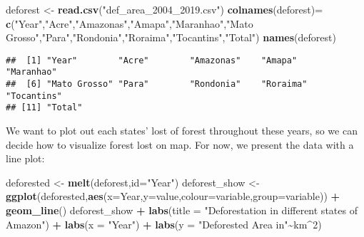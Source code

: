 \documentclass[
]{article}
\newenvironment{Shaded}{\begin{snugshade}}{\end{snugshade}}
\newcommand{\AttributeTok}[1]{\textcolor[rgb]{0.13,0.29,0.53}{#1}}
\newcommand{\DecValTok}[1]{\textcolor[rgb]{0.00,0.00,0.81}{#1}}
\newcommand{\FunctionTok}[1]{\textcolor[rgb]{0.13,0.29,0.53}{\textbf{#1}}}
\newcommand{\NormalTok}[1]{#1}
\newcommand{\OtherTok}[1]{\textcolor[rgb]{0.56,0.35,0.01}{#1}}
\newcommand{\SpecialCharTok}[1]{\textcolor[rgb]{0.81,0.36,0.00}{\textbf{#1}}}
\newcommand{\StringTok}[1]{\textcolor[rgb]{0.31,0.60,0.02}{#1}}
\begin{document}
\begin{Shaded}
\begin{Highlighting}[]
\NormalTok{deforest }\OtherTok{\textless{}{-}} \FunctionTok{read.csv}\NormalTok{(}\StringTok{"def\_area\_2004\_2019.csv"}\NormalTok{)}
\FunctionTok{colnames}\NormalTok{(deforest)}\OtherTok{=} \FunctionTok{c}\NormalTok{(}\StringTok{"Year"}\NormalTok{,}\StringTok{"Acre"}\NormalTok{,}\StringTok{"Amazonas"}\NormalTok{,}\StringTok{"Amapa"}\NormalTok{,}\StringTok{"Maranhao"}\NormalTok{,}\StringTok{"Mato Grosso"}\NormalTok{,}\StringTok{"Para"}\NormalTok{,}\StringTok{"Rondonia"}\NormalTok{,}\StringTok{"Roraima"}\NormalTok{,}\StringTok{"Tocantins"}\NormalTok{,}\StringTok{"Total"}\NormalTok{)}
\FunctionTok{names}\NormalTok{(deforest)}
\end{Highlighting}
\end{Shaded}

\begin{verbatim}
##  [1] "Year"        "Acre"        "Amazonas"    "Amapa"       "Maranhao"   
##  [6] "Mato Grosso" "Para"        "Rondonia"    "Roraima"     "Tocantins"  
## [11] "Total"
\end{verbatim}

We want to plot out each states' lost of forest throughout these years,
so we can decide how to visualize forest lost on map. For now, we
present the data with a line plot:

\begin{Shaded}
\begin{Highlighting}[]
\NormalTok{deforested }\OtherTok{\textless{}{-}} \FunctionTok{melt}\NormalTok{(deforest,}\AttributeTok{id=}\StringTok{"Year"}\NormalTok{)}
\NormalTok{deforest\_show }\OtherTok{\textless{}{-}} \FunctionTok{ggplot}\NormalTok{(deforested,}\FunctionTok{aes}\NormalTok{(}\AttributeTok{x=}\NormalTok{Year,}\AttributeTok{y=}\NormalTok{value,}\AttributeTok{colour=}\NormalTok{variable,}\AttributeTok{group=}\NormalTok{variable)) }\SpecialCharTok{+} \FunctionTok{geom\_line}\NormalTok{()}
\NormalTok{deforest\_show }\SpecialCharTok{+} \FunctionTok{labs}\NormalTok{(}\AttributeTok{title =} \StringTok{"Deforestation in different states of Amazon"}\NormalTok{) }\SpecialCharTok{+} \FunctionTok{labs}\NormalTok{(}\AttributeTok{x =} \StringTok{"Year"}\NormalTok{) }\SpecialCharTok{+} \FunctionTok{labs}\NormalTok{(}\AttributeTok{y =} \StringTok{"Deforested Area in"}\SpecialCharTok{\textasciitilde{}}\NormalTok{km}\SpecialCharTok{\^{}}\DecValTok{2}\NormalTok{)}
\end{Highlighting}
\end{Shaded}
\end{document}
